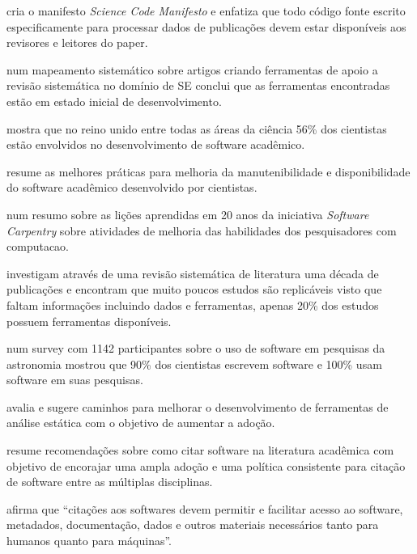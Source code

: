 cria o manifesto {\it Science Code Manifesto} e enfatiza que todo código fonte
escrito especificamente para processar dados de publicações devem estar
disponíveis aos revisores e leitores do paper.

 num mapeamento sistemático sobre artigos criando
ferramentas de apoio a revisão sistemática no domínio de SE conclui que as
ferramentas encontradas estão em estado inicial de desenvolvimento.

 mostra que no reino unido entre todas as áreas da
ciência 56\% dos cientistas estão envolvidos no desenvolvimento de software
acadêmico.

 resume as melhores práticas para melhoria da
manutenibilidade e disponibilidade do software acadêmico desenvolvido por
cientistas.

 num resumo sobre as lições aprendidas em 20
anos da iniciativa {\it Software Carpentry} sobre atividades de melhoria das
habilidades dos pesquisadores com computacao.

investigam através de uma revisão sistemática de literatura uma década de
publicações e encontram que muito poucos estudos são replicáveis visto que
faltam informações incluindo dados e ferramentas, apenas 20\% dos estudos
possuem ferramentas disponíveis.

num survey com 1142 participantes sobre o uso de software em pesquisas da
astronomia mostrou que 90\% dos cientistas escrevem software e 100\% usam
software em suas pesquisas.

 avalia e sugere caminhos para melhorar o
desenvolvimento de ferramentas de análise estática com o objetivo de aumentar a
adoção.

 resume recomendações sobre como citar software
na literatura acadêmica com objetivo de encorajar uma ampla adoção e uma
política consistente para citação de software entre as múltiplas disciplinas.

 afirma que ``citações aos softwares devem
permitir e facilitar acesso ao software, metadados, documentação, dados e
outros materiais necessários tanto para humanos quanto para máquinas''.


